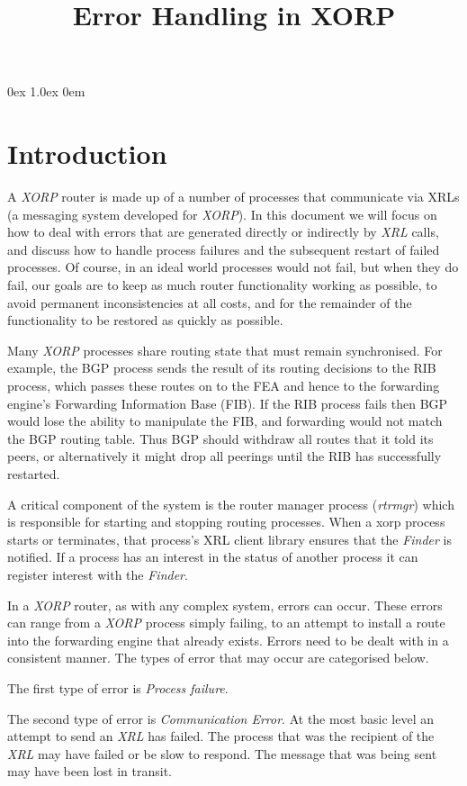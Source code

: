 \documentclass[11pt]{article}
\title{Error Handling in XORP}
\makeatletter
\newcommand{\xorp} {{\em XORP}\@\xspace}
\newcommand{\finder} {{\em Finder}\@\xspace}
\newcommand{\xrl} {{\em XRL}\@\xspace}
\newcommand{\rtrmgr} {{\em rtrmgr}\@\xspace}
\makeatother
\begin{document}
\parsep 0ex
\parskip 1.0ex
\parindent 0em
\noindent
\maketitle                            
\section{Introduction}

A \xorp router is made up of a number of processes that communicate
via XRLs \cite{xorp:xrl} (a messaging system developed for \xorp). In
this document we will focus on how to deal with errors that are
generated directly or indirectly by \xrl calls, and discuss how to
handle process failures and the subsequent restart of failed
processes.  Of course, in an ideal world processes would not fail, but
when they do fail, our goals are to keep as much router
functionality working as possible, to avoid permanent inconsistencies
at all costs, and for the remainder of the functionality to be
restored as quickly as possible.

Many \xorp processes share routing state that must remain
synchronised. For example, the BGP process sends the result of its
routing decisions to the RIB process, which passes these routes on to
the FEA and hence to the forwarding engine's Forwarding Information
Base (FIB). If the RIB process fails then BGP would lose the ability
to manipulate the FIB, and forwarding would not match the BGP routing
table.  Thus BGP should withdraw all routes that it told its peers, or
alternatively it might drop all peerings until the RIB has
successfully restarted.

A critical component of the system is the router manager process
(\rtrmgr) which is responsible for starting and stopping routing
processes. When a xorp process starts or terminates, that
process's XRL client library ensures that the \finder is notified. If
a process has an interest in the status of another process it can
register interest with the \finder.

In a \xorp router, as with any complex system, errors can occur. These
errors can range from a \xorp process simply failing, to an attempt to
install a route into the forwarding engine that already exists. Errors
need to be dealt with in a consistent manner. The types
of error that may occur are categorised below.

The first type of error is {\em Process failure}.

The second type of error is {\em Communication Error}. At the most
basic level an attempt to send an \xrl has failed. The process that
was the recipient of the \xrl may have failed or be slow to respond.
The message that was being sent may have been lost in transit.
\end{document}
